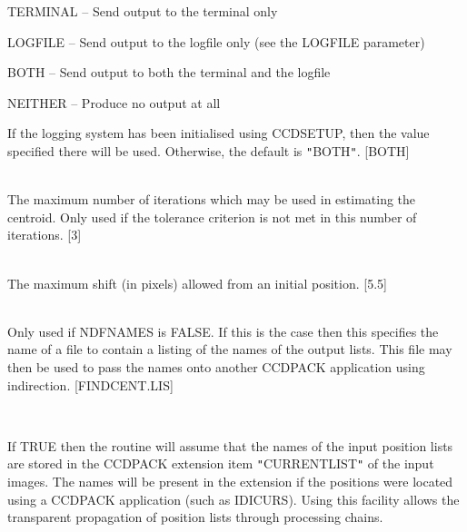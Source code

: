 \documentclass[twoside,11pt]{article}
\newcommand{\htmlref}[2]{#1}
\renewcommand{\_}{\texttt{\symbol{95}}}
\newcommand{\qt}[1]{{\tt "}#1{\tt "}}
\newcommand{\xroutine}[1]{\htmlref{{\sc #1}}{#1}}
\newcommand{\sstsubsection}[1]{ \item[{#1}] \mbox{} \\}
\newcommand{\sstitem}{\item}
\newcommand{\sstsubsection}[1]{\item[{#1}]}
\newcommand{\sstitem}{\item}
\begin{document}
{{{{            \sstitem
               TERMINAL  -- Send output to the terminal only

            \sstitem
               LOGFILE   -- Send output to the logfile only (see the
                               LOGFILE parameter)

            \sstitem
               BOTH      -- Send output to both the terminal and the
                               logfile

            \sstitem
               NEITHER   -- Produce no output at all

         }
         If the logging system has been initialised using \xroutine{CCDSETUP},
         then the value specified there will be used. Otherwise, the
         default is \qt{BOTH}.
         [BOTH]
      }
      \sstsubsection{
         MAXITER = \_INTEGER (Read)
      } {
         The maximum number of iterations which may be used in
         estimating the centroid. Only used if the tolerance criterion
         is not met in this number of iterations.
         [3]
      }
      \sstsubsection{
         MAXSHIFT = \_DOUBLE (Read)
      } {
         The maximum shift (in pixels) allowed from an initial position.
         [5.5]
      }
      \sstsubsection{
         NAMELIST = LITERAL (Read)
      } {
         Only used if NDFNAMES is FALSE. If this is the case then this
         specifies the name of a file to contain a listing of the names
         of the output lists. This file may then be used to pass the
         names onto another CCDPACK application using indirection.
         [FINDCENT.LIS]
      }
      \sstsubsection{
         NDFNAMES = \_LOGICAL (Read)
      } {
         If TRUE then the routine will assume that the names of the
         input position lists are stored in the CCDPACK extension item
         \qt{CURRENT\_LIST} of the input images. The names will be present
         in the extension if the positions were located using a CCDPACK
         application (such as \xroutine{IDICURS}). Using this facility allows the
         transparent propagation of position lists through processing
         chains.

}}}
\end{document}
